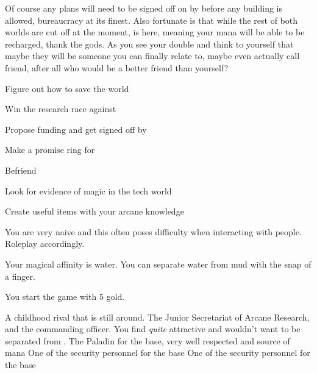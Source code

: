 \documentclass[char]{guildcamp3}
\begin{document}
Of course any plans will need to be signed off on by \cNobleOne{\intro} before any building is allowed, bureaucracy at its finest. Also fortunate is that while the rest of both worlds are cut off at the moment, \cPaladin{} is here, meaning your mana will be able to be recharged, thank the gods. As you see your double and think to yourself that maybe they will be someone you can finally relate to, maybe even actually call friend, after all who would be a better friend than yourself? 

\begin{itemz}[Goals]
  \item Figure out how to save the world
  \item Win the research race against \cMageTwo{}
  \item Propose funding and get signed off by \cNobleOne{}
  \item Make a promise ring for \cNobleOne{}
  \item Befriend \cSciTwo{}
  \item Look for evidence of magic in the tech world
  \item Create useful items with your arcane knowledge
\end{itemz}
%

\begin{itemz}[Notes]
	\item You are very naive and this often poses difficulty when interacting with people. Roleplay accordingly. 
	\item Your magical affinity is water. You can separate water from mud with the snap of a finger.
	\item You start the game with 5 gold. 
\end{itemz}

\begin{contacts}
  \contact{\cMageTwo{}} A childhood rival that is still around.
  \contact{\cNobleOne{}} The Junior Secretariat of Arcane Research, and the commanding officer. You find \cNobleOne{\them} \emph{quite} attractive and wouldn't want to be separated from \cNobleOne{\them}.
  \contact{\cPaladin{}} The Paladin for the base, very well respected and source of mana 
  \contact{\cRogueOne{}} One of the security personnel for the base
  \contact{\cRogueTwo{}} One of the security personnel for the base
\end{contacts}
\end{document}
